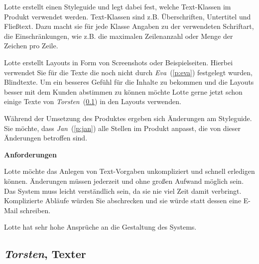 \begin{multicols}{2}
Lotte erstellt einen Styleguide und legt dabei fest, welche Text-Klassen im Produkt verwendet werden. Text-Klassen sind z.B. Überschriften, Untertitel und Fließtext. Dazu macht sie für jede Klasse Angaben zu der verwendeten Schriftart, die Einschränkungen, wie z.B. die maximalen Zeilenanzahl oder Menge der Zeichen pro Zeile.

Lotte erstellt Layouts in Form von Screenshots oder Beispielseiten. Hierbei verwendet Sie für die Texte die noch nicht durch \emph{Eva}~(\ref{p:eva}) festgelegt wurden, Blindtexte. Um ein besseres Gefühl für die Inhalte zu bekommen und die Layouts besser mit dem Kunden abstimmen zu können möchte Lotte gerne jetzt schon einige Texte von \emph{Torsten}~(\ref{p:torsten}) in den Layouts verwenden.

Während der Umsetzung des Produktes ergeben sich Änderungen am Styleguide. Sie möchte, dass \emph{Jan}~(\ref{p:jan}) alle Stellen im Produkt anpasst, die von dieser Änderungen betroffen sind.

\textbf{Anforderungen}

Lotte möchte das Anlegen von Text-Vorgaben unkompliziert und schnell erledigen können. Änderungen müssen jederzeit und ohne großen Aufwand möglich sein. Das System muss leicht verständlich sein, da sie nie viel Zeit damit verbringt. Komplizierte Abläufe würden Sie abschrecken und sie würde statt dessen eine E-Mail schreiben.

Lotte hat sehr hohe Ansprüche an die Gestaltung des Systems.

\end{multicols}

\pagebreak

\subsection{\emph{Torsten}, Texter}\label{p:torsten}

